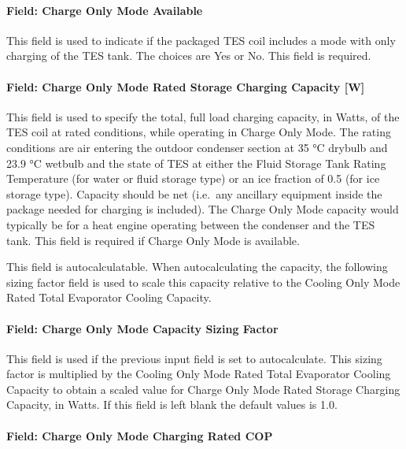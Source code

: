 \paragraph{Field: Charge Only Mode Available}\label{field-charge-only-mode-available}

This field is used to indicate if the packaged TES coil includes a mode with only charging of the TES tank. The choices are Yes or No. This field is required.

\paragraph{Field: Charge Only Mode Rated Storage Charging Capacity {[}W{]}}\label{field-charge-only-mode-rated-storage-charging-capacity-w}

This field is used to specify the total, full load charging capacity, in Watts, of the TES coil at rated conditions, while operating in Charge Only Mode. The rating conditions are air entering the outdoor condenser section at 35 °C drybulb and 23.9 °C wetbulb and the state of TES at either the Fluid Storage Tank Rating Temperature (for water or fluid storage type) or an ice fraction of 0.5 (for ice storage type). Capacity should be net (i.e.~any ancillary equipment inside the package needed for charging is included). The Charge Only Mode capacity would typically be for a heat engine operating between the condenser and the TES tank. This field is required if Charge Only Mode is available.

This field is autocalculatable. When autocalculating the capacity, the following sizing factor field is used to scale this capacity relative to the Cooling Only Mode Rated Total Evaporator Cooling Capacity.

\paragraph{Field: Charge Only Mode Capacity Sizing Factor}\label{field-charge-only-mode-capacity-sizing-factor}

This field is used if the previous input field is set to autocalculate. This sizing factor is multiplied by the Cooling Only Mode Rated Total Evaporator Cooling Capacity to obtain a scaled value for Charge Only Mode Rated Storage Charging Capacity, in Watts. If this field is left blank the default values is 1.0.

\paragraph{Field: Charge Only Mode Charging Rated COP}\label{field-charge-only-mode-charging-rated-cop}

